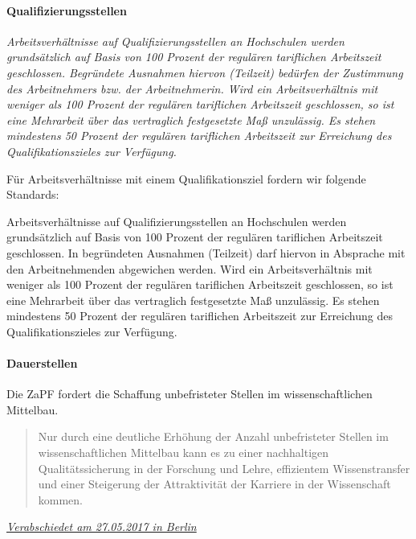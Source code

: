 \hypertarget{qualifizierungsstellen}{%
\paragraph{Qualifizierungsstellen}\label{qualifizierungsstellen}}

\emph{Arbeitsverhältnisse auf Qualifizierungsstellen an Hochschulen
werden grundsätzlich auf Basis von 100 Prozent der regulären tariflichen
Arbeitszeit geschlossen. Begründete Ausnahmen hiervon (Teilzeit)
bedürfen der Zustimmung des Arbeitnehmers bzw. der Arbeitnehmerin. Wird
ein Arbeitsverhältnis mit weniger als 100 Prozent der regulären
tariflichen Arbeitszeit geschlossen, so ist eine Mehrarbeit über das
vertraglich festgesetzte Maß unzulässig. Es stehen mindestens 50 Prozent
der regulären tariflichen Arbeitszeit zur Erreichung des
Qualifikationszieles zur Verfügung.}

Für Arbeitsverhältnisse mit einem Qualifikationsziel fordern wir
folgende Standards:

Arbeitsverhältnisse auf Qualifizierungsstellen an Hochschulen werden
grundsätzlich auf Basis von 100 Prozent der regulären tariflichen
Arbeitszeit geschlossen. In begründeten Ausnahmen (Teilzeit) darf
hiervon in Absprache mit den Arbeitnehmenden abgewichen werden. Wird ein
Arbeitsverhältnis mit weniger als 100 Prozent der regulären tariflichen
Arbeitszeit geschlossen, so ist eine Mehrarbeit über das vertraglich
festgesetzte Maß unzulässig. Es stehen mindestens 50 Prozent der
regulären tariflichen Arbeitszeit zur Erreichung des
Qualifikationszieles zur Verfügung.

\hypertarget{dauerstellen}{%
\paragraph{Dauerstellen}\label{dauerstellen}}

Die ZaPF fordert die Schaffung unbefristeter Stellen im
wissenschaftlichen Mittelbau.

\begin{quote}
Nur durch eine deutliche Erhöhung der Anzahl unbefristeter Stellen im
wissenschaftlichen Mittelbau kann es zu einer nachhaltigen
Qualitätssicherung in der Forschung und Lehre, effizientem
Wissenstransfer und einer Steigerung der Attraktivität der Karriere in
der Wissenschaft kommen.
\end{quote}

\href{https://zapfev.de/resolutionen/sose17/mittelbau/mittelbau.pdf}{\emph{Verabschiedet
am 27.05.2017 in Berlin}}

